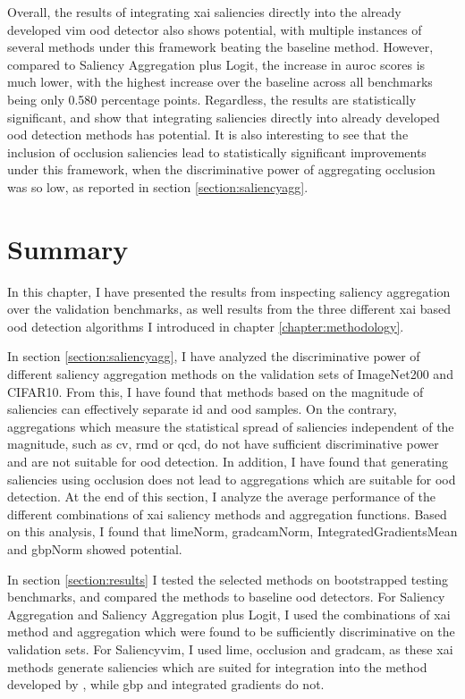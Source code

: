 \documentclass[UKenglish]{uiomasterthesis} %
\theoremstyle{definition}
\begin{document}
Overall, the results of integrating \ac{xai} saliencies directly into the already developed \ac{vim} \ac{ood} detector also shows potential, with multiple instances of several methods under this framework beating the baseline method. However, compared to Saliency Aggregation plus Logit, the increase in \ac{auroc} scores is much lower, with the highest increase over the baseline across all benchmarks being only 0.580 percentage points. Regardless, the results are statistically significant, and show that integrating saliencies directly into already developed \ac{ood} detection methods has potential. It is also interesting to see that the inclusion of occlusion saliencies lead to statistically significant improvements under this framework, when the discriminative power of aggregating occlusion was so low, as reported in section \ref{section:saliencyagg}.

\section{Summary}

In this chapter, I have presented the results from inspecting saliency aggregation over the validation benchmarks, as well results from the three different \ac{xai} based \ac{ood} detection algorithms I introduced in chapter \ref{chapter:methodology}.

In section \ref{section:saliencyagg}, I have analyzed the discriminative power of different saliency aggregation methods on the validation sets of ImageNet200 and CIFAR10. From this, I have found that methods based on the magnitude of saliencies can effectively separate \ac{id} and \ac{ood} samples. On the contrary, aggregations which measure the statistical spread of saliencies independent of the magnitude, such as \ac{cv}, \ac{rmd} or \ac{qcd}, do not have sufficient discriminative power and are not suitable for \ac{ood} detection. In addition, I have found that generating saliencies using occlusion does not lead to aggregations which are suitable for \ac{ood} detection. At the end of this section, I analyze the average performance of the different combinations of \ac{xai} saliency methods and aggregation functions. Based on this analysis, I found that \ac{lime}Norm, \ac{gradcam}Norm, IntegratedGradientsMean and \ac{gbp}Norm showed potential.

In section \ref{section:results} I tested the selected methods on bootstrapped testing benchmarks, and compared the methods to baseline \ac{ood} detectors. For Saliency Aggregation and Saliency Aggregation plus Logit, I used the combinations of \ac{xai} method and aggregation which were found to be sufficiently discriminative on the validation sets. For Saliency\ac{vim}, I used \ac{lime}, occlusion and \ac{gradcam}, as these \ac{xai} methods generate saliencies which are suited for integration into the method developed by \cite{vim}, while \ac{gbp} and integrated gradients do not. 
\end{document}
